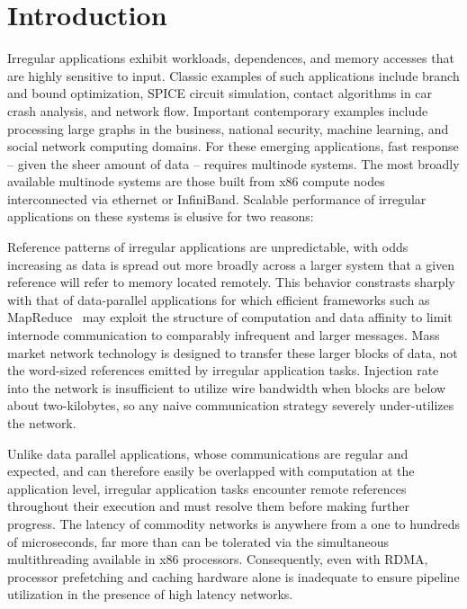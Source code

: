 \section{Introduction} \label{sec:intro}

Irregular applications exhibit workloads, dependences, and memory accesses
that are highly sensitive to input. Classic examples of such applications
include branch and bound optimization, SPICE circuit simulation, contact
algorithms in car crash analysis, and network flow. Important contemporary
examples include processing large graphs in the business, national security,
machine learning, and social network computing domains. For these emerging
applications, fast response -- given the sheer amount of data -- requires
multinode systems. The most broadly available multinode systems are those
built from x86 compute nodes interconnected via ethernet or InfiniBand.
Scalable performance of irregular applications on these systems is elusive
for two reasons:

 Reference patterns of irregular
applications are unpredictable, with odds increasing as data is
spread out more broadly across a larger system that a given reference
will refer to memory located remotely.  This behavior constrasts
sharply with that of data-parallel applications for which efficient
frameworks such as MapReduce~\cite{mapreduce:osdi04} may exploit the
structure of computation and data affinity to limit internode
communication to comparably infrequent and larger messages.  Mass
market network technology is designed to transfer these larger blocks
of data, not the word-sized references emitted by irregular
application tasks. Injection rate into the network is insufficient to
utilize wire bandwidth when blocks are below about two-kilobytes, so
any naive communication strategy severely under-utilizes the network.

 Unlike data parallel applications, whose
communications are regular and expected, and can therefore easily be
overlapped with computation at the application level, irregular
application tasks encounter remote references throughout their execution
and must resolve them before making further progress.  The latency of
commodity networks is anywhere from a one to hundreds of microseconds,
far more than can be tolerated via the simultaneous multithreading
available in x86 processors.  Consequently, even with RDMA, processor
prefetching and caching hardware alone is inadequate to ensure pipeline
utilization in the presence of high latency networks.

